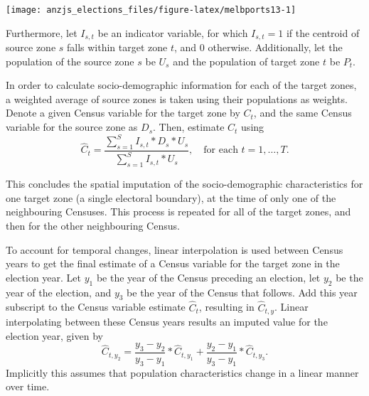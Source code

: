 \documentclass[times, doublespace]{anzsauth}
\let\origfigure\figure
\let\endorigfigure\endfigure
\renewenvironment{figure}[1][2] {
    \expandafter\origfigure\expandafter[htbp]
} {
    \endorigfigure
}
\begin{document}
\begin{figure}[h]

{\centering \texttt{[image: anzjs\_elections\_files/figure-latex/melbports13-1]} 

}

\caption{The electoral boundaries for Melbourne Ports (shown in purple) and surrounding electorates, with centroids for Statistical Area 1 regions from the 2016 Census overlaid. The centroids falling within the purple region are attributed to Melbourne Ports.}\label{fig:melbports13}
\end{figure}

Furthermore, let \(I_{s,t}\) be an indicator variable, for which \(I_{s,t} = 1\) if the centroid of source zone \(s\) falls within target zone \(t\), and \(0\) otherwise. Additionally, let the population of the source zone \(s\) be \(U_s\) and the population of target zone \(t\) be \(P_{t}\).

In order to calculate socio-demographic information for each of the target zones, a weighted average of source zones is taken using their populations as weights. Denote a given Census variable for the target zone by \(C_t\), and the same Census variable for the source zone as \(D_s\). Then, estimate \(C_t\) using
\[
  \hat{C}_t = \frac{\sum_{s=1}^{S}{I_{s,t}*D_s*U_s}}%
  {\sum_{s=1}^{S}{I_{s,t}*U_s}},
  \quad\text{for each $t=1,\dots,T$}.
\]

This concludes the spatial imputation of the socio-demographic characteristics for one target zone (a single electoral boundary), at the time of only one of the neighbouring Censuses. This process is repeated for all of the target zones, and then for the other neighbouring Census.

\enlargethispage*{0.5cm}

To account for temporal changes, linear interpolation is used between Census years to get the final estimate of a Census variable for the target zone in the election year. Let \(y_1\) be the year of the Census preceding an election, let \(y_2\) be the year of the election, and \(y_3\) be the year of the Census that follows. Add this year subscript to the Census variable estimate \(\hat{C}_t\), resulting in \(\hat{C}_{t,y}\). Linear interpolating between these Census years results an imputed value for the election year, given by
\[
  \hat{C}_{t,y_2} = \frac{y_3-y_2}{y_3-y_1} * \hat{C}_{t,y_1} +
    \frac{y_2-y_1}{y_3-y_1} * \hat{C}_{t,y_3}.
\]
Implicitly this assumes that population characteristics change in a linear manner over time.
\end{document}
